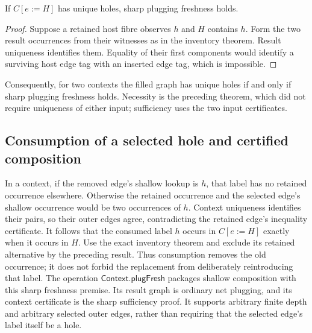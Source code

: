 \begin{theorem}
If $C[e:=H]$ has unique holes, sharp plugging freshness holds.
\end{theorem}
\begin{proof}
Suppose a retained host fibre observes $h$ and $H$ contains $h$. Form the two
result occurrences from their witnesses as in the inventory theorem. Result
uniqueness identifies them. Equality of their first components would identify
a surviving host edge tag with an inserted edge tag, which is impossible.
\end{proof}
Consequently, for two contexts the filled graph has unique holes if and only if
sharp plugging freshness holds. Necessity is the preceding theorem, which did
not require uniqueness of either input; sufficiency uses the two input certificates.

\subsection{Consumption of a selected hole and certified composition}
In a context, if the removed edge's shallow lookup is $h$, that label has no
retained occurrence elsewhere. Otherwise the retained occurrence and the selected
edge's shallow occurrence would be two occurrences of $h$. Context uniqueness
identifies their pairs, so their outer edges agree, contradicting the retained
edge's inequality certificate.
It follows that the consumed label $h$ occurs in $C[e:=H]$ exactly when it occurs
in $H$. Use the exact inventory theorem and exclude its retained alternative
by the preceding result. Thus consumption removes the old occurrence; it does
not forbid the replacement from deliberately reintroducing that label.
The operation $\mathsf{Context.plugFresh}$ packages shallow composition with this
sharp freshness premise. Its result graph is ordinary net plugging, and its
context certificate is the sharp sufficiency proof. It supports arbitrary finite
depth and arbitrary selected outer edges, rather than requiring that the selected
edge's label itself be a hole.
